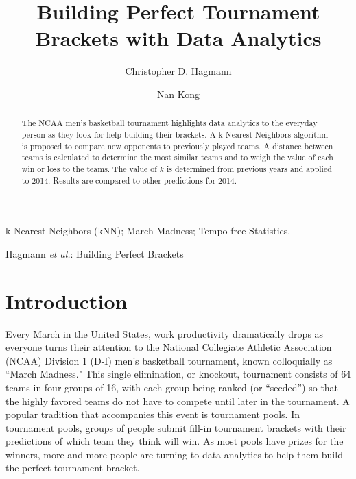 \documentclass[5p, preprint]{elsarticle}
\begin{document}
\title{Building Perfect Tournament Brackets with Data Analytics}

\author[purdue_ChE]{Christopher D. Hagmann}

\author[purdue_BME]{Nan Kong}



\address[purdue_ChE]{School of Chemical Engineering, Purdue University, 480 Stadium Mall Drive, West Lafayette, IN 47907, USA}
\address[purdue_BME]{Weldon School of Biomedical Engineering, Purdue University, West Lafayette, IN 47907, USA}


\begin{abstract}
The NCAA men's basketball tournament highlights data analytics to the everyday person as they look for help building their brackets. A k-Nearest Neighbors algorithm is proposed to compare new opponents to previously played teams. A distance between teams is calculated to determine the most similar teams and to weigh the value of each win or loss to the teams. The value of $k$ is determined from previous years and applied to 2014. Results are compared to other predictions for 2014.
\end{abstract}


\begin{keyword}
k-Nearest Neighbors (kNN); March Madness; Tempo-free Statistics.
\end{keyword}


%
{Hagmann \MakeLowercase{\textit{et al.}}: Building Perfect Brackets}


\maketitle

\section{Introduction}

Every March in the United States, work productivity dramatically drops as everyone turns their attention to the National Collegiate Athletic Association (NCAA) Division 1 (D-I) men's basketball tournament, known colloquially as ``March Madness."  This single elimination, or knockout, tournament consists of 64 teams in four groups of 16, with each group being ranked (or ``seeded'') so that the highly favored teams do not have to compete until later in the tournament. A popular tradition that accompanies this event is tournament pools. In tournament pools, groups of people submit fill-in tournament brackets with their predictions of which team they think will win. As most pools have prizes for the winners, more and more people are turning to data analytics to help them build the perfect tournament bracket. 
\end{document}
